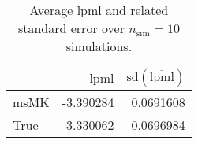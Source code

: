 \begin{table}[H]

\caption{Average lpml and related standard error over $n_{\text{sim}} = 10$ simulations.}
\centering
\begin{tabular}[t]{lrr}
\toprule
  & $\overbar{\text{lpml}}$ & $\text{sd}(\overbar{\text{lpml}})$\\
\midrule
msMK & -3.390284 & 0.0691608\\
True & -3.330062 & 0.0696984\\
\bottomrule
\end{tabular}
\end{table}